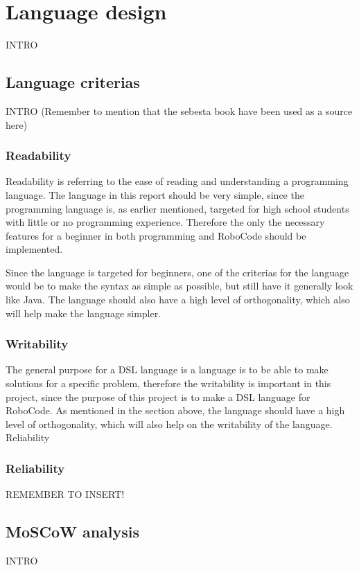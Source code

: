 \chapter{Language design}
INTRO
\section{Language criterias}
INTRO
(Remember to mention that the sebesta book have been used as a source here)

\subsection{Readability}
Readability is referring to the ease of reading and understanding a programming language. The language in this report should be very simple, since the programming language is, as earlier mentioned, targeted for high school students with little or no programming experience. Therefore the only the necessary features for a beginner in both programming and RoboCode should be implemented. 

Since the language is targeted for beginners, one of the criterias for the language would be to make the syntax as simple as possible, but still have it generally look like Java. The language should also have a high level of orthogonality, which also will help make the language simpler. 

\subsection{Writability}
The general purpose for a DSL language is a language is to be able to make solutions for a specific problem, therefore the writability is important in this project, since the purpose of this project is to make a DSL language for RoboCode. As mentioned in the section above, the language should have a high level of orthogonality, which will also help on  the writability of the language. 
Reliability

\subsection{Reliability}
REMEMBER TO INSERT!

\section{MoSCoW analysis}
INTRO


